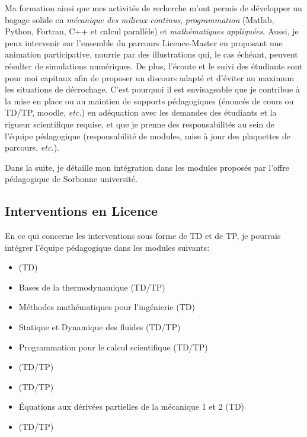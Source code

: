 Ma formation ainsi que mes activités de recherche m'ont permis de développer un bagage solide en \textit{mécanique des milieux continus}, \textit{programmation} (Matlab, Python, Fortran, C++ et calcul parallèle) et \textit{mathématiques appliquées}.
Aussi, je peux intervenir sur l'ensemble du parcours Licence-Master en proposant une animation participative, nourrie par des illustrations qui, le cas échéant, peuvent résulter de simulations numériques.
De plus, l'écoute et le suivi des étudiants sont pour moi capitaux afin de proposer un discours adapté et d'éviter au maximum les situations de décrochage.  
C'est pourquoi il est envisageable que je contribue à la mise en place ou au maintien de supports pédagogiques (énoncés de cours ou TD/TP, moodle, \textit{etc.}) en adéquation avec les demandes des étudiants et la rigueur scientifique requise, et que je prenne des responsabilités au sein de l'équipe pédagogique (responsabilité de modules, mise à jour des plaquettes de parcours, \textit{etc.}).

Dans la suite, je détaille mon intégration dans les modules proposés par l'offre pédagogique de Sorbonne université.
\subsection*{Interventions en Licence}
\label{sec:interv-en-licence}

En ce qui concerne les interventions sous forme de TD et de TP, je pourrais intégrer l'équipe pédagogique dans les modules suivants:
\begin{itemize}
\item {} (TD)
\item Bases de la thermodynamique (TD/TP)
\item Méthodes mathématiques pour l’ingénierie (TD)
\item Statique et Dynamique des fluides (TD/TP)
\item Programmation pour le calcul scientifique (TD/TP)
\item {} (TD/TP)
\item {} (TD/TP)
\item {\'E}quations aux dérivées partielles de la mécanique 1 et 2 (TD)
\item {} (TD/TP) 
\end{itemize}

